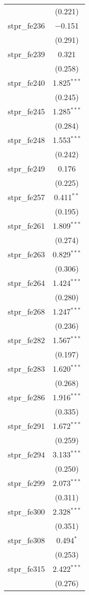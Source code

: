 \begin{table}[!htbp]
\begin{tabular}{@{\extracolsep{5pt}}lc}
  & (0.221) \\ 
  stpr\_fe236 & $-$0.151 \\ 
  & (0.291) \\ 
  stpr\_fe239 & 0.321 \\ 
  & (0.258) \\ 
  stpr\_fe240 & 1.825$^{***}$ \\ 
  & (0.245) \\ 
  stpr\_fe245 & 1.285$^{***}$ \\ 
  & (0.284) \\ 
  stpr\_fe248 & 1.553$^{***}$ \\ 
  & (0.242) \\ 
  stpr\_fe249 & 0.176 \\ 
  & (0.225) \\ 
  stpr\_fe257 & 0.411$^{**}$ \\ 
  & (0.195) \\ 
  stpr\_fe261 & 1.809$^{***}$ \\ 
  & (0.274) \\ 
  stpr\_fe263 & 0.829$^{***}$ \\ 
  & (0.306) \\ 
  stpr\_fe264 & 1.424$^{***}$ \\ 
  & (0.280) \\ 
  stpr\_fe268 & 1.247$^{***}$ \\ 
  & (0.236) \\ 
  stpr\_fe282 & 1.567$^{***}$ \\ 
  & (0.197) \\ 
  stpr\_fe283 & 1.620$^{***}$ \\ 
  & (0.268) \\ 
  stpr\_fe286 & 1.916$^{***}$ \\ 
  & (0.335) \\ 
  stpr\_fe291 & 1.672$^{***}$ \\ 
  & (0.259) \\ 
  stpr\_fe294 & 3.133$^{***}$ \\ 
  & (0.250) \\ 
  stpr\_fe299 & 2.073$^{***}$ \\ 
  & (0.311) \\ 
  stpr\_fe300 & 2.328$^{***}$ \\ 
  & (0.351) \\ 
  stpr\_fe308 & 0.494$^{*}$ \\ 
  & (0.253) \\ 
  stpr\_fe315 & 2.422$^{***}$ \\ 
  & (0.276) \\ 

\end{tabular}
\end{table}
